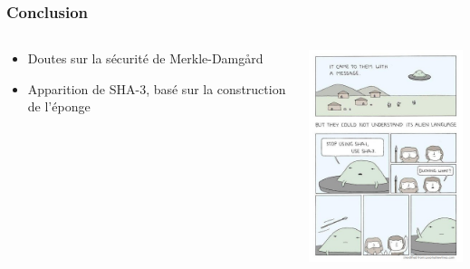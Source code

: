 \begin{frame}[fragile]
  \frametitle{Conclusion}

  \begin{minipage}[0.2\textheight]{\textwidth}
    \begin{columns}[T]
      \begin{column}{0.5\textwidth}
        \vspace{2cm}
        \begin{itemize}
        \item{Doutes sur la sécurité de Merkle-Damg\r{a}rd}
          \vspace{1.5cm}
        \item{Apparition de SHA-3, basé sur la construction de l'éponge}
          \vfill
        \end{itemize}
        \vfill
      \end{column}
      \begin{column}{0.5\textwidth}
        \includegraphics[width=5.5cm]{Conclu-Memoire.jpg}
      \end{column}
      \end{columns}
      \end{minipage}
  \vfill
\end{frame}
